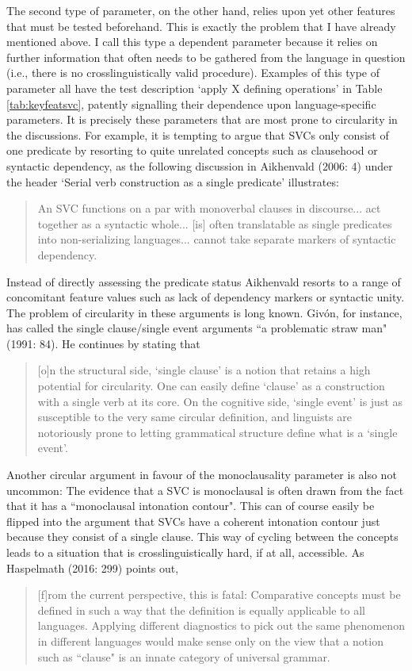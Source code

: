 The second type of parameter, on the other hand, relies upon yet other features that must be tested beforehand. This is exactly the problem that I have already mentioned above. I call this type a dependent parameter because it relies on further information that often needs to be gathered from the language in question (i.e., there is no crosslinguistically valid procedure). Examples of this type of parameter all have the test description `apply X defining operations' in Table \ref{tab:keyfeatsvc}, patently signalling their dependence upon language-specific parameters. It is precisely these parameters that are most prone to circularity in the discussions. For example, it is tempting to argue that SVCs only consist of one predicate by resorting to quite unrelated concepts such as clausehood or syntactic dependency, as the following discussion in Aikhenvald (2006: 4) under the header `Serial verb construction as a single predicate' illustrates:
\begin{quote}An SVC functions on a par with monoverbal clauses in discourse... act together as a syntactic whole... [is] often translatable as single predicates into non-serializing languages... cannot take separate markers of syntactic dependency.\end{quote} 

Instead of directly assessing the predicate status Aikhenvald resorts to a range of concomitant feature values such as lack of dependency markers or syntactic unity. The problem of circularity in these arguments is long known. Givón, for instance, has called the single clause/single event arguments ``a problematic straw man" (1991: 84). He continues by stating that
\begin{quote}[o]n the structural side,
`single clause' is a notion that retains a high potential for circularity. One can
easily define `clause' as a construction with a single verb at its core. On the
cognitive side, `single event' is just as susceptible to the very same circular
definition, and linguists are notoriously prone to letting grammatical structure
define what is a `single event'.\end{quote}

Another circular argument in favour of the monoclausality parameter is also not uncommon: The evidence that a SVC is monoclausal is often drawn from the fact that it has a ``monoclausal intonation contour". This can of course easily be flipped into the argument that SVCs have a coherent intonation contour just because they consist of a single clause. This way of cycling between the concepts leads to a situation that is crosslinguistically hard, if at all, accessible. As Haspelmath (2016: 299) points out, 
\begin{quote}[f]rom the current perspective, this is fatal: Comparative concepts must be defined in
such a way that the definition is equally applicable to all languages. Applying different
diagnostics to pick out the same phenomenon in different languages would make sense
only on the view that a notion such as ``clause" is an innate category of universal
grammar.\end{quote}

